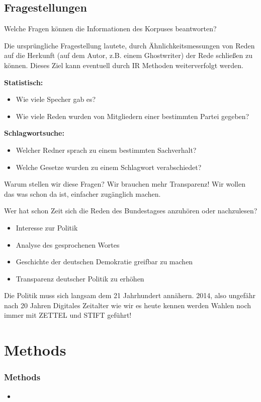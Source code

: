 \documentclass[11pt, a4paper]{beamer}
\begin{document}
\subsection{Fragestellungen}
\begin{frame}{Welche Fragen können die Informationen des Korpuses beantworten?}

Die ursprüngliche Fragestellung lautete, durch Ähnlichkeitsmessungen von Reden
auf die Herkunft (auf dem Autor, z.B. einem Ghostwriter) der Rede schließen zu
können. Dieses Ziel kann eventuell durch IR Methoden weiterverfolgt werden.  

\textbf{Statistisch:}
\begin{itemize}
\item Wie viele Specher gab es?
\item Wie viele Reden wurden von Mitgliedern einer bestimmten Partei gegeben?
\end{itemize}
\textbf{Schlagwortsuche:}
\begin{itemize}
\item Welcher Redner sprach zu einem bestimmten Sachverhalt?
\item Welche Gesetze wurden zu einem Schlagwort verabschiedet?
\end{itemize}
\end{frame}
\begin{frame}{Warum stellen wir diese Fragen?}
Wir brauchen mehr Transparenz! Wir wollen das was schon da ist, einfacher
zugänglich machen.

Wer hat schon Zeit sich die Reden des Bundestagses anzuhören oder nachzulesen?

\begin{itemize}
\item Interesse zur Politik
\item Analyse des gesprochenen Wortes 
\item Geschichte der deutschen Demokratie greifbar zu machen
\item Transparenz deutscher Politik zu erhöhen
\end{itemize}

Die Politik muss sich langsam dem 21 Jahrhundert annähern. 
2014, also ungefähr nach 20 Jahren Digitales Zeitalter wie wir es heute kennen
werden Wahlen noch immer mit ZETTEL und STIFT geführt!

\end{frame}
\section{Methods}
\begin{frame}
\frametitle{Methods}
\begin{itemize}
\item 
\end{itemize}
\end{frame}
\end{document}
